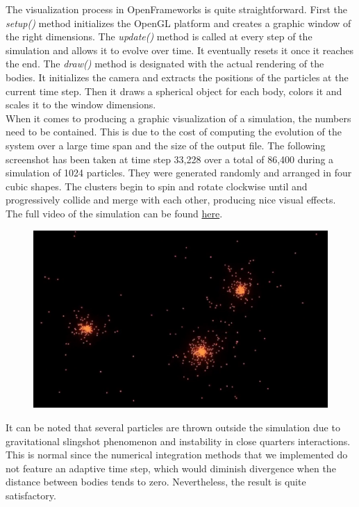 \documentclass{article}
\begin{document}
The visualization process in OpenFrameworks is quite straightforward.
First the \textit{setup()} method initializes the OpenGL platform and creates a graphic window of the right dimensions.
The \textit{update()} method is called at every step of the simulation and allows it to evolve over time. It eventually resets it once it reaches the end. The \textit{draw()} method is designated with the actual rendering of the bodies. It initializes the camera and extracts the positions of the particles at the current time step. Then it draws a spherical object for each body, colors it and scales it to the window dimensions. \\

\newpage When it comes to producing a graphic visualization of a simulation, the numbers need to be contained. This is due to the cost of computing the evolution of the system over a large time span and the size of the output file. The following screenshot has been taken at time step 33,228 over a total of 86,400 during a simulation of 1024 particles. They were generated randomly and arranged in four cubic shapes. The clusters begin to spin and rotate clockwise until and progressively collide and merge with each other, producing nice visual effects. The full video of the simulation can be found \href{https://github.com/AMSC22-23/N-Body-simulator/tree/main/examples/example_OF}{here}. 

\begin{figure} [h]
    \centering
    \includegraphics[width=1\textwidth]
    {images/definitive_simulation.png}
    \label{fig:my_label}
\end{figure}

It can be noted that several particles are thrown outside the simulation due to gravitational slingshot phenomenon and instability in close quarters interactions. This is normal since the numerical integration methods that we implemented do not feature an adaptive time step, which would diminish divergence when the distance between bodies tends to zero. Nevertheless, the result is quite satisfactory.

\newpage
\printbibliography
\end{document}
